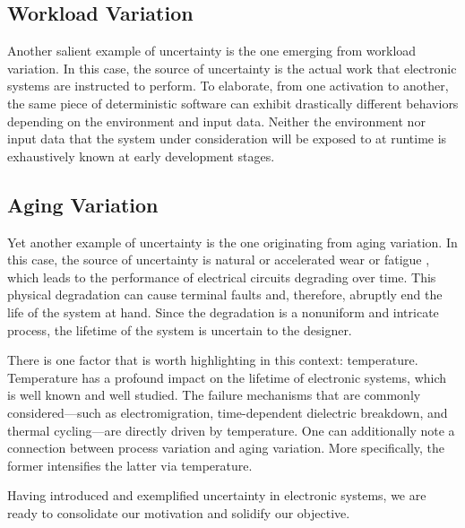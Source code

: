 \subsection{Workload Variation}

Another salient example of uncertainty is the one emerging from workload
variation. In this case, the source of uncertainty is the actual work that
electronic systems are instructed to perform. To elaborate, from one activation
to another, the same piece of deterministic software can exhibit drastically
different behaviors depending on the environment and input data. Neither the
environment nor input data that the system under consideration will be exposed
to at runtime is exhaustively known at early development stages.

\subsection{Aging Variation}

Yet another example of uncertainty is the one originating from aging variation.
In this case, the source of uncertainty is natural or accelerated wear or
fatigue \cite{jedec2016}, which leads to the performance of electrical circuits
degrading over time. This physical degradation can cause terminal faults and,
therefore, abruptly end the life of the system at hand. Since the degradation is
a nonuniform and intricate process, the lifetime of the system is uncertain to
the designer.

There is one factor that is worth highlighting in this context: temperature.
Temperature has a profound impact on the lifetime of electronic systems, which
is well known and well studied. The failure mechanisms that are commonly
considered---such as electromigration, time-dependent dielectric breakdown, and
thermal cycling---are directly driven by temperature. One can additionally note
a connection between process variation and aging variation. More specifically,
the former intensifies the latter via temperature.

\conclusioncut
Having introduced and exemplified uncertainty in electronic systems, we are
ready to consolidate our motivation and solidify our objective.
